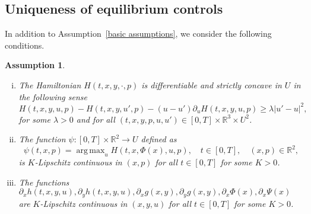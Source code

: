 \documentclass[12pt]{article}
\DeclareMathOperator*{\argmax}{arg\,max}
\newtheorem{assumption}{Assumption}
\theoremstyle{named}
\numberwithin{equation}{section}
\newcommand{\real}{\mathbb{R}}
\begin{document}
\subsection{Uniqueness of equilibrium controls}
\label{sec:uniqueness}
 In addition to Assumption~\ref{basic assumptions},
 we consider the following conditions.
\begin{assumption}
    \label{unique assump}
    \begin{enumerate}[i)]
    \item
        \label{a-i}
The Hamiltonian  $H(t,x,y,\cdot,p)$
is differentiable and strictly concave in $U$ in the following sense
\begin{equation}
  \label{concave}
                H(t, x,y, u, p) - H(t, x,y, u', p) - (u-u') \partial_{u}H(t, x,y, u, p) \geq \lambda \lvert u'-u \rvert^2,
            \end{equation}
            for some $\lambda > 0$ and for all $(t,x,y,p,u,u')\in [0,T] \times\mathbb{R}^3 \times U^2$.
          \item
        \label{a-ii}
 The function $\psi:[0,T]\times\mathbb{R}^2\rightarrow U$
 defined as
\begin{equation*}
    \psi(t,x,p) = \argmax_u H(t,x, \Phi(x), u, p), \quad t\in [0,T], \quad (x,p) \in \real^2,
\end{equation*}
 is $K$-Lipschitz continuous in $(x,p)$ for all $t \in [0,T]$ for some $K>0$.
\item
  \label{a-iii}
        The functions $\partial_x h(t,x,y,u), \partial_y h(t,x,y,u), \partial_x g(x,y), \partial_y g(x,y), \partial_x \Phi(x), \partial_x \Psi(x)$ are $K$-Lipschitz continuous in $( x, y, u )$ for all $t \in [0,T]$ for some $K>0$.

\end{enumerate}
\end{assumption}
\end{document}
